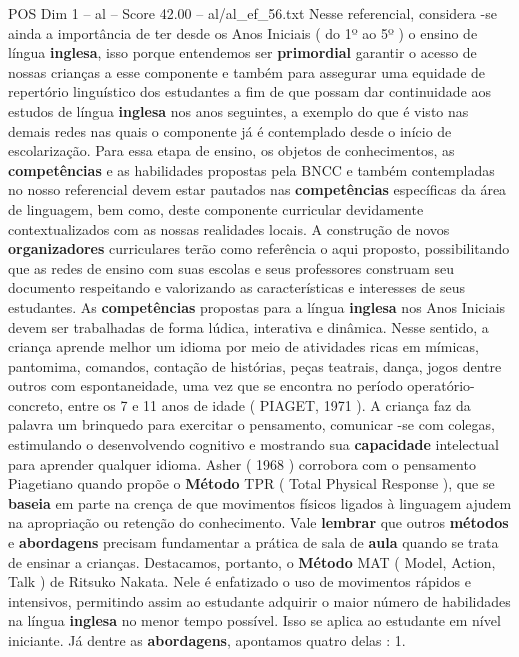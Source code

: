 \begin{textsample}{POS Dim 1 – al – Score 42.00 – al/al\_ef\_56.txt}
Nesse referencial, considera -se ainda a importância de ter desde os Anos Iniciais ( do 1º ao 5º ) o ensino de língua \textbf{inglesa}, isso porque entendemos ser \textbf{primordial} garantir o acesso de nossas crianças a esse componente e também para assegurar uma equidade de repertório linguístico dos estudantes a fim de que possam dar continuidade aos estudos de língua \textbf{inglesa} nos anos seguintes, a exemplo do que é visto nas demais redes nas quais o componente já é contemplado desde o início de escolarização.
Para essa etapa de ensino, os objetos de conhecimentos, as \textbf{competências} e as habilidades propostas pela BNCC e também contempladas no nosso referencial devem estar pautados nas \textbf{competências} específicas da área de linguagem, bem como, deste componente curricular devidamente contextualizados com as nossas realidades locais.
A construção de novos \textbf{organizadores} curriculares terão como referência o aqui proposto, possibilitando que as redes de ensino com suas escolas e seus professores construam seu documento respeitando e valorizando as características e interesses de seus estudantes.
As \textbf{competências} propostas para a língua \textbf{inglesa} nos Anos Iniciais devem ser trabalhadas de forma lúdica, interativa e dinâmica.
Nesse sentido, a criança aprende melhor um idioma por meio de atividades ricas em mímicas, pantomima, comandos, contação de histórias, peças teatrais, dança, jogos dentre outros com espontaneidade, uma vez que se encontra no período operatório-concreto, entre os 7 e 11 anos de idade ( PIAGET, 1971 ).
A criança faz da palavra um brinquedo para exercitar o pensamento, comunicar -se com colegas, estimulando o desenvolvendo cognitivo e mostrando sua \textbf{capacidade} intelectual para aprender qualquer idioma.
Asher ( 1968 ) corrobora com o pensamento Piagetiano quando propõe o \textbf{Método} TPR ( Total Physical Response ), que se \textbf{baseia} em parte na crença de que movimentos físicos ligados à linguagem ajudem na apropriação ou retenção do conhecimento.
Vale \textbf{lembrar} que outros \textbf{métodos} e \textbf{abordagens} precisam fundamentar a prática de sala de \textbf{aula} quando se trata de ensinar a crianças.
Destacamos, portanto, o \textbf{Método} MAT ( Model, Action, Talk ) de Ritsuko Nakata.
Nele é enfatizado o uso de movimentos rápidos e intensivos, permitindo assim ao estudante adquirir o maior número de habilidades na língua \textbf{inglesa} no menor tempo possível.
Isso se aplica ao estudante em nível iniciante.
Já dentre as \textbf{abordagens}, apontamos quatro delas : 1.

\end{textsample}
